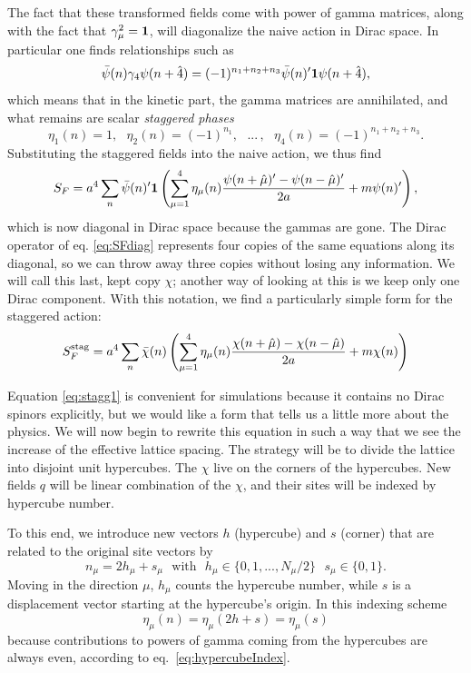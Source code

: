 The fact that these transformed fields come with power of gamma matrices,
along with the fact that $\gamma_\mu^2={\mathbf 1}$, will
diagonalize the naive action in Dirac space. In particular one finds
relationships such as
\begin{equation}
  \bar{\psi}(n)\gamma_4\psi(n+\hat{4})
      =(-1)^{n_1+n_2+n_3}\bar{\psi}(n)'{\mathbf 1}\psi(n+\hat{4}),
\end{equation}
which means that in the kinetic part, the gamma matrices are annihilated,
and what remains are scalar {\it staggered phases}
\begin{equation}
   \eta_1(n)=1, ~~~
   \eta_2(n)=(-1)^{n_1}, ~~~
   ...\,, ~~~
   \eta_4(n)=(-1)^{n_1+n_2+n_3}.
\end{equation}
Substituting the staggered fields
into the naive action, we thus find
\begin{equation}\label{eq:SFdiag}
   S_F
     =a^4\sum_n\bar{\psi}(n)'{\mathbf 1}\left(\sum_{\mu=1}^4\eta_\mu(n)
       \frac{\psi(n+\hat{\mu})'-\psi(n-\hat{\mu})'}{2a}
       +m\psi(n)'\right),
\end{equation}
which is now diagonal in Dirac space because the gammas are gone.
The Dirac operator of eq. \eqref{eq:SFdiag} represents four copies of
the same equations along its diagonal, so we can throw away three copies
without losing any information. We will call this last, kept copy $\chi$;
another way of looking at this is we keep only one Dirac component.
With this notation, we find a particularly simple form for the staggered
action:
\begin{equation}\label{eq:stagg1}
  S_F^{\rm stag}
     =a^4\sum_n\bar{\chi}(n)\left(\sum_{\mu=1}^4\eta_\mu(n)
       \frac{\chi(n+\hat{\mu})-\chi(n-\hat{\mu})}{2a}
       +m\chi(n)\right)
\end{equation}

Equation \eqref{eq:stagg1} is convenient for simulations because it contains no
Dirac spinors explicitly, but we would like a form that tells us a little
more about the physics. We will now begin to rewrite this equation in such
a way that we see the increase of the effective lattice spacing. The
strategy will be to divide the lattice into disjoint unit hypercubes.
The $\chi$ live on the corners of the hypercubes. New fields $q$ will be 
linear combination of the $\chi$, and their sites will be indexed by 
hypercube number.

To this end, we introduce new vectors $h$ (hypercube) and $s$ (corner) that
are related to the original site vectors by
\begin{equation}\label{eq:hypercubeIndex}
  n_\mu=2h_\mu+s_\mu~~~\text{with}~~~h_\mu\in\{0, 1, ..., N_\mu/2\}
                    ~~~s_\mu\in\{0,1\}.
\end{equation}
Moving in the direction $\mu$, $h_\mu$ counts the hypercube number,
while $s$ is a displacement vector starting at the hypercube's origin.
In this indexing scheme
\begin{equation}
  \eta_\mu(n)=\eta_\mu(2h+s)=\eta_\mu(s)
\end{equation}
because contributions to powers of gamma coming from the hypercubes are
always even, according to eq.~\eqref{eq:hypercubeIndex}.

